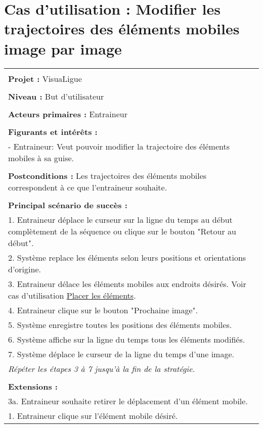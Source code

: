 \section{Cas d'utilisation : Modifier les trajectoires des éléments mobiles image par image}
\begin{longtable}{|p{16cm}|}
	\hline
	\\
	\textbf{Projet :} VisuaLigue\\
	\\
	\textbf{Niveau :} But d'utilisateur\\
	\\
	\textbf{Acteurs primaires :} Entraineur\\
	\\
	\textbf{Figurants et intérêts :} \\
	- Entraineur: Veut pouvoir modifier la trajectoire des éléments mobiles à sa guise.\\
	\\
	\textbf{Postconditions :} Les trajectoires des éléments mobiles correspondent à ce que l'entraineur souhaite.\\
	\\
	\textbf{Principal scénario de succès :}\\
	1. Entraineur déplace le curseur sur la ligne du temps au début complètement de la séquence ou clique sur le bouton "Retour au début".\\
	2. Système replace les éléments selon leurs positions et orientations d'origine.\\
	3. Entraineur délace les éléments mobiles aux endroits désirés. Voir cas d'utilisation \underline{Placer les éléments}.\\
	4. Entraineur clique sur le bouton "Prochaine image".\\
	5. Système enregistre toutes les positions des éléments mobiles.\\
	6. Système affiche sur la ligne du temps tous les éléments modifiés.\\
	7. Système déplace le curseur de la ligne du temps d'une image.\\
	\textit{Répéter les étapes 3 à 7 jusqu'à la fin de la stratégie.}\\
	\\
	\textbf{Extensions :}\\
	3a. Entraineur souhaite retirer le déplacement d'un élément mobile.\\
	\hspace{0.5cm}1. Entraineur clique sur l'élément mobile désiré.\\

\end{longtable}

